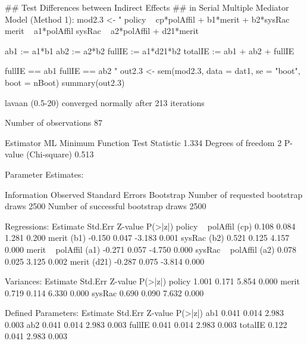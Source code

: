 \begin{Schunk}
\begin{Sinput}
 ## Test Differences between Indirect Effects
 ## in Serial Multiple Mediator Model (Method 1):
 mod2.3 <- "
 policy ~ cp*polAffil + b1*merit + b2*sysRac
 merit ~ a1*polAffil
 sysRac ~ a2*polAffil + d21*merit
 
 ab1 := a1*b1
 ab2 := a2*b2
 fullIE := a1*d21*b2
 totalIE := ab1 + ab2 + fullIE 
 
 fullIE == ab1
 fullIE == ab2
 "
 out2.3 <- 
     sem(mod2.3, data = dat1, se = "boot", boot = nBoot)
 summary(out2.3)
\end{Sinput}
\begin{Soutput}
lavaan (0.5-20) converged normally after 213 iterations

  Number of observations                            87

  Estimator                                         ML
  Minimum Function Test Statistic                1.334
  Degrees of freedom                                 2
  P-value (Chi-square)                           0.513

Parameter Estimates:

  Information                                 Observed
  Standard Errors                            Bootstrap
  Number of requested bootstrap draws             2500
  Number of successful bootstrap draws            2500

Regressions:
                   Estimate  Std.Err  Z-value  P(>|z|)
  policy ~                                            
    polAffil  (cp)    0.108    0.084    1.281    0.200
    merit     (b1)   -0.150    0.047   -3.183    0.001
    sysRac    (b2)    0.521    0.125    4.157    0.000
  merit ~                                             
    polAffil  (a1)   -0.271    0.057   -4.750    0.000
  sysRac ~                                            
    polAffil  (a2)    0.078    0.025    3.125    0.002
    merit    (d21)   -0.287    0.075   -3.814    0.000

Variances:
                   Estimate  Std.Err  Z-value  P(>|z|)
    policy            1.001    0.171    5.854    0.000
    merit             0.719    0.114    6.330    0.000
    sysRac            0.690    0.090    7.632    0.000

Defined Parameters:
                   Estimate  Std.Err  Z-value  P(>|z|)
    ab1               0.041    0.014    2.983    0.003
    ab2               0.041    0.014    2.983    0.003
    fullIE            0.041    0.014    2.983    0.003
    totalIE           0.122    0.041    2.983    0.003


\end{Soutput}
\end{Schunk}

